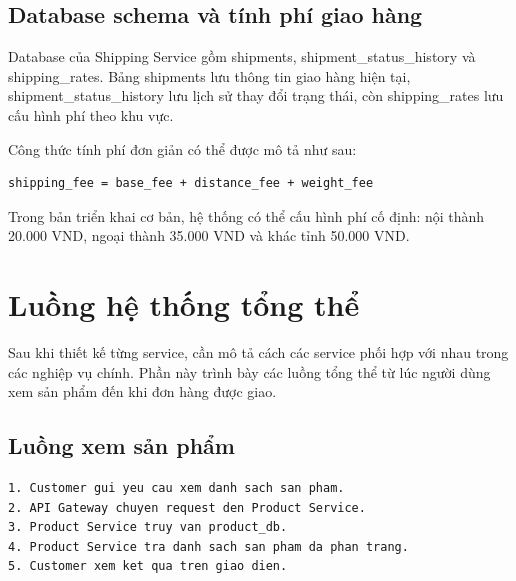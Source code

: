 \documentclass[../main.tex]{subfiles}
\begin{document}
\subsection{Database schema và tính phí giao hàng}
\label{subsection:2.8.4}

Database của Shipping Service gồm shipments, shipment\_status\_history và shipping\_rates. Bảng shipments lưu thông tin giao hàng hiện tại, shipment\_status\_history lưu lịch sử thay đổi trạng thái, còn shipping\_rates lưu cấu hình phí theo khu vực.

Công thức tính phí đơn giản có thể được mô tả như sau:

\begin{lstlisting}[caption={Công thức tính phí giao hàng}, label={lst:chapter2-shipping-fee}]
shipping_fee = base_fee + distance_fee + weight_fee
\end{lstlisting}

Trong bản triển khai cơ bản, hệ thống có thể cấu hình phí cố định: nội thành 20.000 VND, ngoại thành 35.000 VND và khác tỉnh 50.000 VND.

\section{Luồng hệ thống tổng thể}
\label{section:2.9}

Sau khi thiết kế từng service, cần mô tả cách các service phối hợp với nhau trong các nghiệp vụ chính. Phần này trình bày các luồng tổng thể từ lúc người dùng xem sản phẩm đến khi đơn hàng được giao.

\subsection{Luồng xem sản phẩm}
\label{subsection:2.9.1}

\begin{lstlisting}[caption={Luồng xem sản phẩm}, label={lst:chapter2-view-product-flow}]
1. Customer gui yeu cau xem danh sach san pham.
2. API Gateway chuyen request den Product Service.
3. Product Service truy van product_db.
4. Product Service tra danh sach san pham da phan trang.
5. Customer xem ket qua tren giao dien.
\end{lstlisting}
\end{document}
